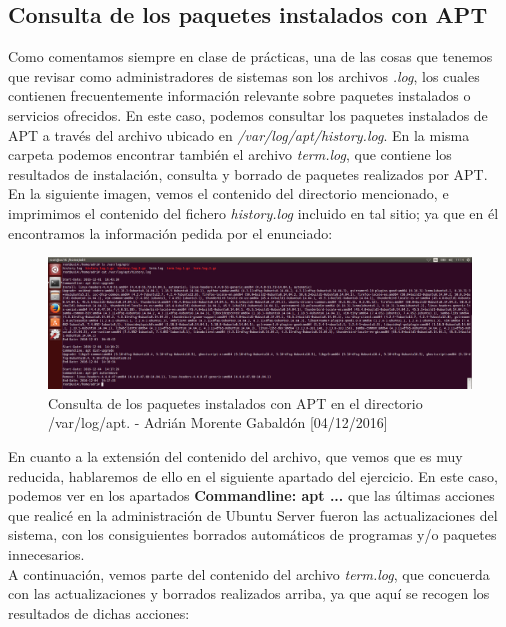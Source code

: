 	\subsection{Consulta de los paquetes instalados con APT}
	Como comentamos siempre en clase de prácticas, una de las cosas que tenemos que revisar como administradores de sistemas son los archivos \emph{.log}, los cuales contienen frecuentemente información relevante sobre paquetes instalados o servicios ofrecidos. En este caso, podemos consultar los paquetes instalados de APT a través del archivo ubicado en \emph{/var/log/apt/history.log}. En la misma carpeta podemos encontrar también el archivo \emph{term.log}, que contiene los resultados de instalación, consulta y borrado de paquetes realizados por APT. \\
	En la siguiente imagen, vemos el contenido del directorio mencionado, e imprimimos el contenido del fichero \emph{history.log} incluido en tal sitio; ya que en él encontramos la información pedida por el enunciado:
	\begin{figure}[H]
		\centering
		\includegraphics[scale=0.3]{apt-history}
		\caption{Consulta de los paquetes instalados con APT en el directorio /var/log/apt. - Adrián Morente Gabaldón [04/12/2016]}
		\label{figura1}
	\end{figure}
	En cuanto a la extensión del contenido del archivo, que vemos que es muy reducida, hablaremos de ello en el siguiente apartado del ejercicio. En este caso, podemos ver en los apartados \textbf{Commandline: apt ...} que las últimas acciones que realicé en la administración de Ubuntu Server fueron las actualizaciones del sistema, con los consiguientes borrados automáticos de programas y/o paquetes innecesarios. \\
	A continuación, vemos parte del contenido del archivo \emph{term.log}, que concuerda con las actualizaciones y borrados realizados arriba, ya que aquí se recogen los resultados de dichas acciones:
